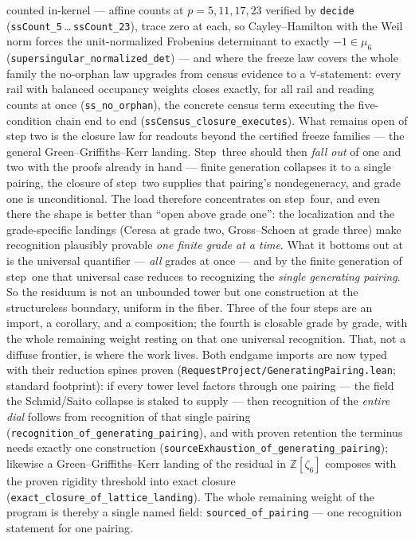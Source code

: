 \documentclass[11pt]{article}
\theoremstyle{definition}
\theoremstyle{remark}
\begin{document}
counted in-kernel --- affine counts at $p=5,11,17,23$ verified by
\texttt{decide} (\texttt{ssCount\_5}\,\dots\,\texttt{ssCount\_23}), trace
zero at each, so Cayley--Hamilton with the Weil norm forces the
unit-normalized Frobenius determinant to exactly $-1\in\mu_6$
(\texttt{supersingular\_normalized\_det}) --- and where the freeze law
covers the whole family the no-orphan law upgrades from census evidence
to a $\forall$-statement: every rail with balanced occupancy weights
closes exactly, for all rail and reading counts at once
(\texttt{ss\_no\_orphan}), the concrete census term executing the
five-condition chain end to end
(\texttt{ssCensus\_closure\_executes}).  What remains open of step two is the
closure law for readouts beyond the certified freeze families --- the
general Green--Griffiths--Kerr landing. Step~three should then \emph{fall out}
of one and two with the proofs already in hand --- finite generation collapses it
to a single pairing, the closure of step~two supplies that pairing's
nondegeneracy, and grade one is unconditional. The load therefore concentrates on
step~four, and even there the shape is better than ``open above grade one'': the
localization and the grade-specific landings (Ceresa at grade two, Gross--Schoen
at grade three) make recognition plausibly provable \emph{one finite grade at a
time}. What it bottoms out at is the universal quantifier --- \emph{all} grades at
once --- and by the finite generation of step~one that universal case reduces to
recognizing the \emph{single generating pairing}. So the residuum is not an
unbounded tower but one construction at the structureless boundary, uniform in the
fiber. Three of the four steps are an import, a corollary, and a composition; the
fourth is closable grade by grade, with the whole remaining weight resting on that
one universal recognition. That, not a diffuse frontier, is where the work
lives. Both endgame imports are now typed with their reduction spines proven
(\texttt{RequestProject/GeneratingPairing.lean}; standard footprint): if every
tower level factors through one pairing --- the field the Schmid/Saito
collapse is staked to supply --- then recognition of the \emph{entire dial}
follows from recognition of that single pairing
(\texttt{recognition\_of\_generating\_pairing}), and with proven retention the
terminus needs exactly one construction
(\texttt{sourceExhaustion\_of\_generating\_pairing}); likewise a
Green--Griffiths--Kerr landing of the residual in $\mathbb Z[\zeta_6]$
composes with the proven rigidity threshold into exact closure
(\texttt{exact\_closure\_of\_lattice\_landing}). The whole remaining weight of
the program is thereby a single named field:
\texttt{sourced\_of\_pairing} --- one recognition statement for one pairing.
\end{document}
